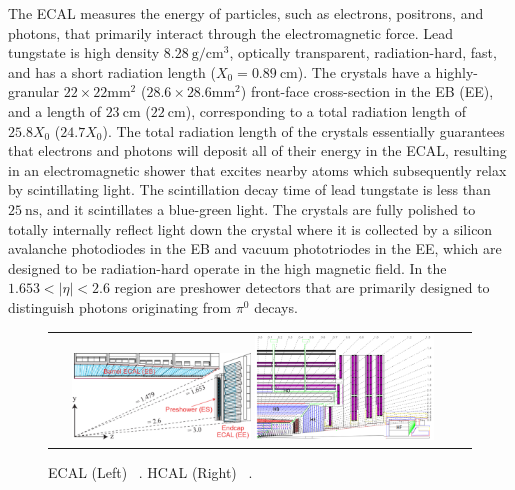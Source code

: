 The ECAL measures the energy of particles, such as electrons, positrons, and photons, that primarily interact through the electromagnetic force.
Lead tungstate is high density $\SI{8.28}{\g\per\cm\cubed}$, optically transparent, radiation-hard, fast, and has a short radiation length ($X_0 = \SI{0.89}{\cm}$).
The crystals have a highly-granular $22 \times 22 \si{\mm\squared}$ ($28.6 \times 28.6 \si{\mm\squared}$) front-face cross-section in the EB (EE), and a length of $\SI{23}{\cm}$ ($\SI{22}{\cm}$), corresponding to a total radiation length of $25.8X_0$ ($24.7X_0$).
The total radiation length of the crystals essentially guarantees that electrons and photons will deposit all of their energy in the ECAL, resulting in an electromagnetic shower that excites nearby atoms which subsequently relax by scintillating light.
The scintillation decay time of lead tungstate is less than $\SI{25}{\ns}$, and it scintillates a blue-green light.
The crystals are fully polished to totally internally reflect light down the crystal where it is collected by a silicon avalanche photodiodes in the EB and vacuum phototriodes in the EE, which are designed to be radiation-hard operate in the high magnetic field.
In the $1.653 < \vert \eta \vert < 2.6$ region are preshower detectors that are primarily designed to distinguish photons originating from $\pi^0$ decays.

\begin{figure}[!h]
  \begin{center}
    \begin{tabular}{cc}
        \includegraphics[width=0.45\textwidth]{fig_LHC_CMS/ECAL.pdf}
        \includegraphics[width=0.45\textwidth]{fig_LHC_CMS/HCAL.png}
    \end{tabular}
    \caption{ECAL (Left) ~\cite{Bayatian:922757}.
            HCAL (Right) ~\cite{Chatrchyan:1129810}.
            }
    \label{ECAL_HCAL}
  \end{center}
\end{figure}

